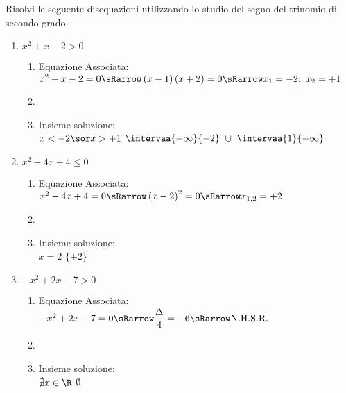 \begin{esempio}{}{}
Risolvi le seguente disequazioni utilizzando lo studio del segno del trinomio 
di secondo grado.

\begin{enumerate}
\item \(x^2+x-2>0\)

\begin{enumerate}
 \item
  Equazione Associata:~~\(x^2+x-2=0 \sRarrow 
\left(x-1 \right)\left(x+2\right)=0 \sRarrow 
x_1=-2;~x_2=+1\)
 \item 
                   {}
 \item 
Insieme soluzione: \\
                  {\(x<-2 \sor x>+1\)}
                  {\(\intervaa{-\infty}{-2}~\cup~\intervaa{1}{-\infty}\)}
\end{enumerate}

\item \(x^2-4x+4\leqslant0\)

\begin{enumerate}
 \item
  Equazione Associata:~\(x^2-4x+4=0 \sRarrow 
                        \left(x-2 \right)^2=0 \sRarrow 
                        x_{1,2}=+2\)
 \item 
                   {}
 \item 
Insieme soluzione: \\
                  {\(x=2\)}
                  {\(\lbrace +2 \rbrace\)}
\end{enumerate}

\item \(-x^2+2x-7>0\)

\begin{enumerate}
 \item
  Equazione Associata:~\(-x^2+2x-7=0 \sRarrow 
                        \dfrac{\Delta}{4} = -6 \sRarrow 
                        \text{N.H.S.R.}\)
 \item 
                   {\parabolaamidmi}
 \item 
Insieme soluzione: \\
                  {\(\nexists x \in \R\)}
                  {\(\emptyset\)}
\end{enumerate}


\end{enumerate}
\end{esempio}
